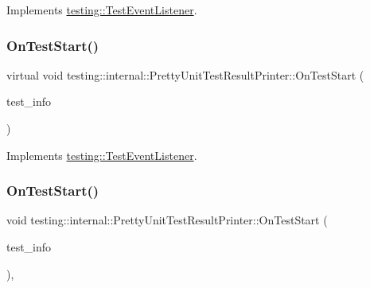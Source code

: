 Implements \mbox{\hyperlink{classtesting_1_1_test_event_listener_a5f6c84f39851e8a603a2d2e10063816b}{testing\+::\+Test\+Event\+Listener}}.

\mbox{\label{classtesting_1_1internal_1_1_pretty_unit_test_result_printer_a8133130bf8254da0a78e39ac34155410}} 
\subsubsection{\texorpdfstring{OnTestStart()}{OnTestStart()}\hspace{0.1cm}{\footnotesize\ttfamily [1/3]}}
{\footnotesize\ttfamily virtual void testing\+::internal\+::\+Pretty\+Unit\+Test\+Result\+Printer\+::\+On\+Test\+Start (\begin{DoxyParamCaption}\item[{const \mbox{\hyperlink{classtesting_1_1_test_info}{Test\+Info}} \&}]{test\+\_\+info }\end{DoxyParamCaption})\hspace{0.3cm}{\ttfamily [virtual]}}



Implements \mbox{\hyperlink{classtesting_1_1_test_event_listener_ab4f6a0ca16ae75daf385b3b5914e1048}{testing\+::\+Test\+Event\+Listener}}.

\mbox{\label{classtesting_1_1internal_1_1_pretty_unit_test_result_printer_a079ac0eb5f8cdd2511cfd33ef931338b}} 
\subsubsection{\texorpdfstring{OnTestStart()}{OnTestStart()}\hspace{0.1cm}{\footnotesize\ttfamily [2/3]}}
{\footnotesize\ttfamily void testing\+::internal\+::\+Pretty\+Unit\+Test\+Result\+Printer\+::\+On\+Test\+Start (\begin{DoxyParamCaption}\item[{const \mbox{\hyperlink{classtesting_1_1_test_info}{Test\+Info}} \&}]{test\+\_\+info }\end{DoxyParamCaption})\hspace{0.3cm}{\ttfamily [override]}, {\ttfamily [virtual]}}



